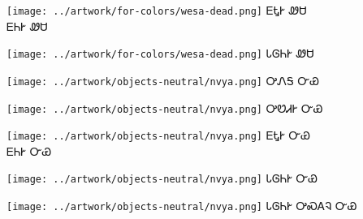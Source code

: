 \documentclass[avery5371]{flashcards}%
\begin{document}
\begin{flashcard}{
\texttt{[image: ../artwork/for-colors/wesa-dead.png]}
}\Huge ᎬᎿᎨ ᏪᏌ\\ᎬᏂᎨ ᏪᏌ
\end{flashcard}

\begin{flashcard}{
\texttt{[image: ../artwork/for-colors/wesa-dead.png]}
}\Huge ᏓᎶᏂᎨ ᏪᏌ
\end{flashcard}


\begin{flashcard}{
\texttt{[image: ../artwork/objects-neutral/nvya.png]}
}\Huge ᎤᏁᎦ ᏅᏯ
\end{flashcard}

\begin{flashcard}{
\texttt{[image: ../artwork/objects-neutral/nvya.png]}
}\Huge ᎤᏬᏗᎨ ᏅᏯ
\end{flashcard}

\begin{flashcard}{
\texttt{[image: ../artwork/objects-neutral/nvya.png]}
}\Huge ᎬᎿᎨ ᏅᏯ\\ᎬᏂᎨ ᏅᏯ
\end{flashcard}

\begin{flashcard}{
\texttt{[image: ../artwork/objects-neutral/nvya.png]}
}\Huge ᏓᎶᏂᎨ ᏅᏯ
\end{flashcard}

\begin{flashcard}{
\texttt{[image: ../artwork/objects-neutral/nvya.png]}
}\Huge ᏓᎶᏂᎨ ᎤᏍᎪᎸ ᏅᏯ
\end{flashcard}
\end{document}
